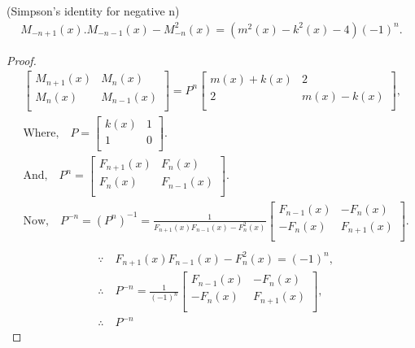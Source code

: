 \begin{theorem}(Simpson's identity for negative n)
\begin{align}
M_{-n+1}(x).M_{-n-1}(x)-M_{-n}^2(x)=(m^2(x)-k^2(x)-4)(-1)^n.
\end{align}
\end{theorem}
\begin{proof}
\begin{align*}
&{
 \begin{bmatrix}
    M_{n+1}(x) & M_{n}(x) \\
    M_{n}(x) & M_{n-1}(x) \\
  \end{bmatrix}
}=P^n{
          \begin{bmatrix}
            m(x)+k(x) & 2 \\
            2 & m(x)-k(x) \\
          \end{bmatrix}
        },\\
		&\text{Where,} \quad P={
          \begin{bmatrix}
            k(x) & 1 \\
            1& 0 \\
          \end{bmatrix}
      }.\\
&\text{And,}\quad P^n={
 \begin{bmatrix}
    F_{n+1}(x) & F_{n}(x) \\
    F_{n}(x) & F_{n-1}(x) \\
  \end{bmatrix}
}.\\
&\text{Now,}\quad P^{-n}=(P^n)^{-1}=\frac{1}{F_{n+1}(x)F_{n-1}(x)-F_{n}^2(x)}
{ \begin{bmatrix}
    F_{n-1}(x) & -F_{n}(x) \\
    -F_{n}(x) & F_{n+1}(x) \\
  \end{bmatrix}
}.\\
\end{align*}	
 \begin{align*}	
&\because\quad
F_{n+1}(x)F_{n-1}(x)-F_{n}^2(x)=(-1)^n,\\
&\therefore\quad P^{-n}=\frac{1}{(-1)^n}
{
 \begin{bmatrix}
    F_{n-1}(x) & -F_{n}(x) \\
    -F_{n}(x)& F_{n+1}(x) \\
  \end{bmatrix}
},\\
&\therefore\quad P^{-n}

\end{align*}
\end{proof}
